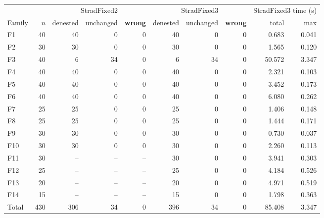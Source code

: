 \begin{tabular}{@{}l r rrr rrr rr@{}}
\toprule
 & & \multicolumn{3}{c}{StradFixed2} & \multicolumn{3}{c}{StradFixed3} & \multicolumn{2}{c}{StradFixed3 time (s)}\\
\cmidrule(lr){3-5}\cmidrule(lr){6-8}\cmidrule(lr){9-10}
Family & $n$ & denested & unchanged & \textbf{wrong} & denested & unchanged & \textbf{wrong} & total & max\\\midrule
F1 & 40 & 40 & 0 & 0 & 40 & 0 & 0 & 0.683 & 0.041\\
F2 & 30 & 30 & 0 & 0 & 30 & 0 & 0 & 1.565 & 0.120\\
F3 & 40 & 6 & 34 & 0 & 6 & 34 & 0 & 50.572 & 3.347\\
F4 & 40 & 40 & 0 & 0 & 40 & 0 & 0 & 2.321 & 0.103\\
F5 & 40 & 40 & 0 & 0 & 40 & 0 & 0 & 3.452 & 0.173\\
F6 & 40 & 40 & 0 & 0 & 40 & 0 & 0 & 6.080 & 0.262\\
F7 & 25 & 25 & 0 & 0 & 25 & 0 & 0 & 1.406 & 0.148\\
F8 & 25 & 25 & 0 & 0 & 25 & 0 & 0 & 1.444 & 0.171\\
F9 & 30 & 30 & 0 & 0 & 30 & 0 & 0 & 0.730 & 0.037\\
F10 & 30 & 30 & 0 & 0 & 30 & 0 & 0 & 2.260 & 0.113\\
F11 & 30 & -- & -- & -- & 30 & 0 & 0 & 3.941 & 0.303\\
F12 & 25 & -- & -- & -- & 25 & 0 & 0 & 4.184 & 0.526\\
F13 & 20 & -- & -- & -- & 20 & 0 & 0 & 4.971 & 0.519\\
F14 & 15 & -- & -- & -- & 15 & 0 & 0 & 1.798 & 0.363\\
\midrule Total & 430 & 306 & 34 & 0 & 396 & 34 & 0 & 85.408 & 3.347\\
\bottomrule
\end{tabular}